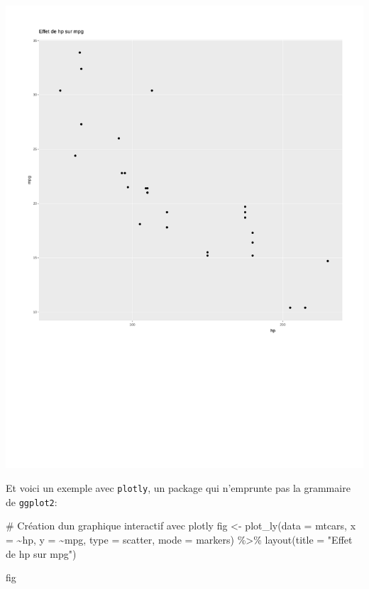 \documentclass[
  letterpaper,
  DIV=11,
  numbers=noendperiod]{scrreprt}
\newenvironment{Shaded}{\begin{snugshade}}{\end{snugshade}}
\newcommand{\AttributeTok}[1]{\textcolor[rgb]{0.40,0.45,0.13}{#1}}
\newcommand{\CommentTok}[1]{\textcolor[rgb]{0.37,0.37,0.37}{#1}}
\newcommand{\FunctionTok}[1]{\textcolor[rgb]{0.28,0.35,0.67}{#1}}
\newcommand{\NormalTok}[1]{\textcolor[rgb]{0.00,0.23,0.31}{#1}}
\newcommand{\OtherTok}[1]{\textcolor[rgb]{0.00,0.23,0.31}{#1}}
\newcommand{\SpecialCharTok}[1]{\textcolor[rgb]{0.37,0.37,0.37}{#1}}
\newcommand{\StringTok}[1]{\textcolor[rgb]{0.13,0.47,0.30}{#1}}
\begin{document}
\includegraphics{chapitre_6_files/figure-pdf/unnamed-chunk-14-1.pdf}

Et voici un exemple avec \texttt{plotly}, un package qui n'emprunte pas
la grammaire de \texttt{ggplot2}:

\begin{Shaded}
\begin{Highlighting}[]
\CommentTok{\# Création d\textquotesingle{}un graphique interactif avec plotly}
\NormalTok{fig }\OtherTok{\textless{}{-}} \FunctionTok{plot\_ly}\NormalTok{(}\AttributeTok{data =}\NormalTok{ mtcars, }\AttributeTok{x =} \SpecialCharTok{\textasciitilde{}}\NormalTok{hp, }\AttributeTok{y =} \SpecialCharTok{\textasciitilde{}}\NormalTok{mpg, }\AttributeTok{type =} \StringTok{\textquotesingle{}scatter\textquotesingle{}}\NormalTok{, }\AttributeTok{mode =} \StringTok{\textquotesingle{}markers\textquotesingle{}}\NormalTok{) }\SpecialCharTok{\%\textgreater{}\%}
  \FunctionTok{layout}\NormalTok{(}\AttributeTok{title =} \StringTok{"Effet de hp sur mpg"}\NormalTok{)}

\NormalTok{fig}
\end{Highlighting}
\end{Shaded}
\end{document}
